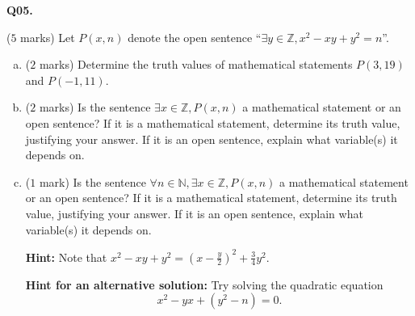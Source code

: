 \documentclass[11pt]{article}
\begin{document}
\textbf{Q05.}

($5$ marks) Let $P(x, n)$ denote the open sentence ``$\exists y \in \mathbb Z, x^2 - xy + y^2 = n$''.

\begin{enumerate}[(a)]
\item ($2$ marks) Determine the truth values of mathematical statements $P(3, 19)$ and $P(-1, 11)$.

\item ($2$ marks) Is the sentence $\exists x \in \mathbb Z, P(x, n)$ a mathematical statement or an open sentence? If it is a mathematical statement, determine its truth value, justifying your answer. If it is an open sentence, explain what variable(s) it depends on.

\item ($1$ mark) Is the sentence $\forall n \in \mathbb N, \exists x \in \mathbb Z, P(x, n)$ a mathematical statement or an open sentence? If it is a mathematical statement, determine its truth value, justifying your answer. If it is an open sentence, explain what variable(s) it depends on.

\textbf{Hint:} Note that $x^2 - xy + y^2 = \left(x - \frac{y}{2}\right)^2 + \frac{3}{4}y^2$.

\textbf{Hint for an alternative solution:} Try solving the quadratic equation
%
$$
x^2 - yx + (y^2 - n) = 0.
$$
\end{enumerate}
\end{document}
